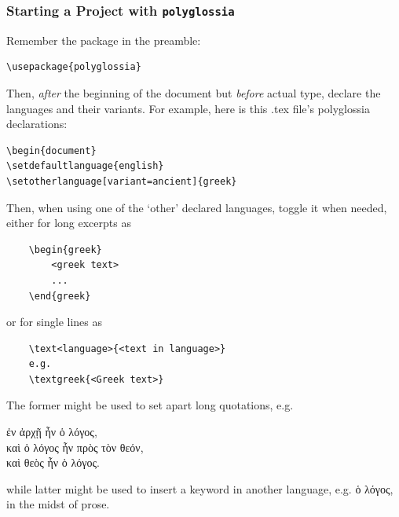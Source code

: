 \documentclass{beamer}
\begin{document}
\begin{frame}[fragile]
	\frametitle[Using polyglossia]{Starting a Project with \texttt{polyglossia}}

Remember the package in the preamble:

\begin{lstlisting}
\usepackage{polyglossia}
\end{lstlisting} 

\vspace{1em}

Then, \emph{after} the beginning of the document but \emph{before} actual type, declare the languages and their variants. For example, here is this .tex file's polyglossia declarations:

\begin{lstlisting}
\begin{document}
\setdefaultlanguage{english}
\setotherlanguage[variant=ancient]{greek}
\end{lstlisting}

\end{frame}

\begin{frame}[fragile]	
	
Then, when using one of the `other' declared languages, toggle it when needed, either for long excerpts as
	
{\scriptsize \begin{lstlisting}
	\begin{greek}
		<greek text>
		...
	\end{greek}
\end{lstlisting}}
	
or for single lines as
	
{\scriptsize \begin{lstlisting}
	\text<language>{<text in language>}
	e.g.
	\textgreek{<Greek text>}
\end{lstlisting}} \break

The former might be used to set apart long quotations, e.g. \break

{\scriptsize \begin{greek}
ἐν ἀρχῇ ἦν ὁ λόγος, \\
καὶ ὁ λόγος ἦν πρὸς τὸν θεόν, \\
καὶ θεὸς ἦν ὁ λόγος. \\
\end{greek}}

\break \vspace{1em}

while latter might be used to insert a keyword in another language, e.g. {\textgreek{ὁ λόγος}}, in the midst of prose.
	
\end{frame}
\end{document}

